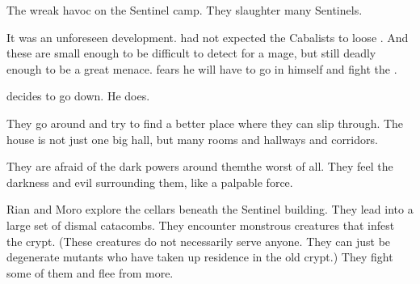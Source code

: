 \begin{comment}
  \section{Banes wreak havoc}
\end{comment}
\new
The \banes wreak havoc on the Sentinel camp. 
They slaughter many Sentinels. 

It was an unforeseen development.
\Psyrex had not expected the Cabalists to loose \banes. 
And these \lesserbanes are small enough to be difficult to detect for a mage, but still deadly enough to be a great menace. 
\Psyrex fears he will have to go in himself and fight the \banes. 

\Psyrex decides to go down.
He does. 





\begin{comment}
  \section{Moro and Rian attack}
\end{comment}
\new
\begin{comment}
  \subsection{Looking around}
\end{comment}
They go around and try to find a better place where they can slip through.
The house is not just one big hall, but many rooms and hallways and corridors. 

They are afraid of the dark powers around them\dash the \banes{} worst of all. 
They feel the darkness and evil surrounding them, like a palpable force. 


Rian and Moro \Cornel{} explore the cellars beneath the Sentinel building.
They lead into a large set of dismal catacombs.  
They encounter monstrous creatures that infest the crypt. 
(These creatures do not necessarily serve anyone. They can just be degenerate mutants who have taken up residence in the old crypt.) 
They fight some of them and flee from more. 

